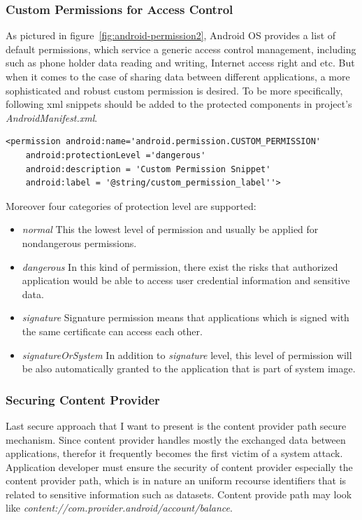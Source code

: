 \subsubsection{Custom Permissions for Access Control}

As pictured in figure~\ref{fig:android-permission2}, Android OS provides a list of default permissions, which service a generic access control management, including such as  phone  holder data reading and writing, Internet access right and etc. But when it comes to the case of sharing data between different applications, a more sophisticated and robust custom permission is desired. To be more specifically, following xml snippets should be added to the protected components in project's \emph{AndroidManifest.xml}\cite{android_secure_cook}.

\begin{Verbatim}[fontsize=\relsize{-1},frame=lines,framesep=4mm, label=\fbox{\small\emph{Custom Permission Snippet}}]
<permission android:name='android.permission.CUSTOM_PERMISSION'
	android:protectionLevel ='dangerous'
	android:description = 'Custom Permission Snippet'
	android:label = '@string/custom_permission_label''>
\end{Verbatim} 
Moreover four categories of protection level are supported\cite{android_secure_cook}:
\begin{itemize}
\item \emph{normal} This the lowest level of permission and usually be applied for nondangerous permissions. 
\item \emph{dangerous}  In this kind of permission, there exist the risks that authorized application would be able to access user credential information and sensitive data.
\item \emph{signature} Signature permission means that applications  which is signed with the same certificate can access each other.
\item \emph{signatureOrSystem} In addition to \emph{signature} level, this level of permission will be also automatically granted to the application that is part of system image.
\end{itemize}
\subsubsection{Securing Content Provider}
Last secure approach that I want to present is the content provider path  secure mechanism. Since content provider handles mostly the exchanged data between applications, therefor it frequently becomes the first victim of a system attack. Application developer must ensure the security of content provider especially the content  provider path, which is in nature an uniform recourse identifiers that is related  to sensitive information such as datasets\cite{android_secure_cook}. Content provide path may look like \emph{content://com.provider.android/account/balance}.

